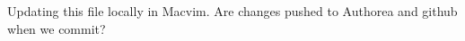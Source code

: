 %
%
\coordinatedobs          %

Updating this file locally in Macvim. Are changes pushed to Authorea and github when we commit?
